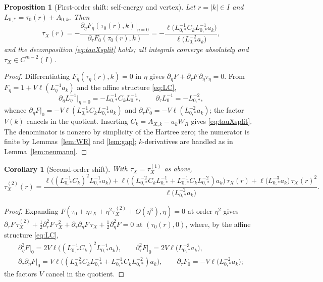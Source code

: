 \documentclass[11pt,a4paper]{amsart}
\newtheorem{proposition}[theorem]{Proposition}
\newtheorem{corollary}[theorem]{Corollary}
\theoremstyle{definition}
\theoremstyle{remark}
\newcommand{\ellf}{\ell}
\begin{document}
\begin{proposition}[First-order shift: self-energy and vertex]\label{prop:shift}
Let $r=|k|\in I$ and $L_{0,*}=\tau_0(r)+A_{0,k}$. Then
\begin{equation}\label{eq:tauX}
\tau_X(r)=-\frac{\partial_\eta F_\eta(\tau_0(r),k)\big|_{\eta=0}}{\partial_\tau F_0(\tau_0(r),k)}
=-\frac{\ellf\bigl(L_{0,*}^{-1}C_kL_{0,*}^{-1}a_k\bigr)}{\ellf\bigl(L_{0,*}^{-2}a_k\bigr)},
\end{equation}
and the decomposition \eqref{eq:tauXsplit} holds; all integrals converge absolutely and $\tau_X\in C^{m-2}(I)$.
\end{proposition}

\begin{proof}
Differentiating $F_\eta(\tau_\eta(r),k)=0$ in $\eta$ gives $\partial_\eta F+\partial_\tau F\,\partial_\eta\tau_\eta=0$. From $F_\eta=1+V\ellf(L_\eta^{-1}a_k)$ and the affine structure \eqref{eq:LC},
\[
\partial_\eta L_\eta^{-1}\big|_{\eta=0}=-L_{0,*}^{-1}C_kL_{0,*}^{-1},\qquad
\partial_\tau L_0^{-1}=-L_{0,*}^{-2},
\]
whence $\partial_\eta F|_0=-V\ellf(L_{0,*}^{-1}C_kL_{0,*}^{-1}a_k)$ and $\partial_\tau F_0=-V\ellf(L_{0,*}^{-2}a_k)$; the factor $V(k)$ cancels in the quotient. Inserting $C_k=A_{X,k}-a_kW_R$ gives \eqref{eq:tauXsplit}. The denominator is nonzero by simplicity of the Hartree zero; the numerator is finite by Lemmas~\ref{lem:WR} and \ref{lem:gap}; $k$-derivatives are handled as in Lemma~\ref{lem:neumann}.
\end{proof}

\begin{corollary}[Second-order shift]\label{cor:second}
With $\tau_X=\tau_X^{(1)}$ as above,
\begin{equation}\label{eq:tau2}
\tau_X^{(2)}(r)
=\frac{\ellf\bigl((L_{0,*}^{-1}C_k)^2L_{0,*}^{-1}a_k\bigr)
+\ellf\bigl((L_{0,*}^{-2}C_kL_{0,*}^{-1}+L_{0,*}^{-1}C_kL_{0,*}^{-2})a_k\bigr)\,\tau_X(r)
+\ellf\bigl(L_{0,*}^{-3}a_k\bigr)\,\tau_X(r)^2}
{\ellf\bigl(L_{0,*}^{-2}a_k\bigr)} .
\end{equation}
\end{corollary}

\begin{proof}
Expanding $F(\tau_0+\eta\tau_X+\eta^2\tau_X^{(2)}+O(\eta^3),\eta)=0$ at order $\eta^2$ gives
$\partial_\tau F\,\tau_X^{(2)}+\tfrac12\partial^2_\tau F\,\tau_X^2+\partial_\tau\partial_\eta F\,\tau_X+\tfrac12\partial^2_\eta F=0$ at $(\tau_0(r),0)$, where, by the affine structure \eqref{eq:LC},
\begin{gather*}
\partial_\eta^2F\big|_0=2V\ellf\bigl((L_{0,*}^{-1}C_k)^2L_{0,*}^{-1}a_k\bigr),\qquad
\partial_\tau^2F\big|_0=2V\ellf\bigl(L_{0,*}^{-3}a_k\bigr),\\
\partial_\tau\partial_\eta F\big|_0=V\ellf\bigl((L_{0,*}^{-2}C_kL_{0,*}^{-1}+L_{0,*}^{-1}C_kL_{0,*}^{-2})a_k\bigr),\qquad
\partial_\tau F_0=-V\ellf\bigl(L_{0,*}^{-2}a_k\bigr);
\end{gather*}
the factors $V$ cancel in the quotient.
\end{proof}
\end{document}
